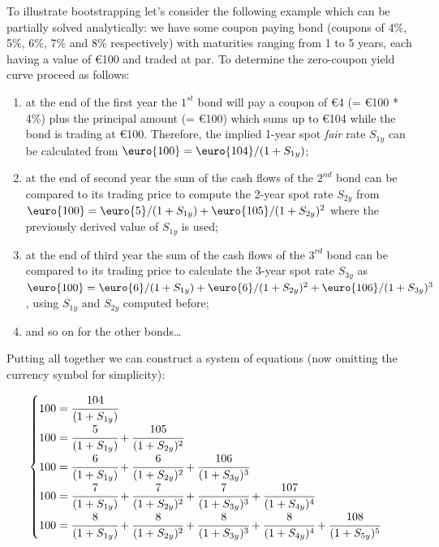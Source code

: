 To illustrate bootstrapping let's consider the following example which can be partially solved analytically: we have some coupon paying bond (coupons of 4\%, 5\%, 6\%, 7\% and 8\% respectively) with maturities ranging from 1 to 5 years, each having a value of \euro{100} and traded at par. To determine the zero-coupon yield curve proceed as follows:
\begin{enumerate}
\item at the end of the first year the $1^{st}$ bond will pay a coupon of \euro{4} (= \euro{100} * 4\%) plus the principal amount (= \euro{100}) which sums up to \euro{104} while the bond is trading at \euro{100}. Therefore, the implied 1-year spot \emph{fair} rate $S_{1y}$ can be calculated from $\mbox{\euro{100}} = \mbox{\euro{104}} / (1 + S_{1y})$;

\item at the end of second year the sum of the cash flows of the $2^{nd}$ bond can be compared to its trading price to compute the 2-year spot rate $S_{2y}$ from $\mbox{\euro{100}} = \mbox{\euro{5}} / (1 + S_{1y}) + \mbox{\euro{105}} / (1 + S_{2y})^{2}$ where the previously derived value of $S_{1y}$ is used;

\item at the end of third year the sum of the cash flows of the $3^{rd}$ bond can be compared to its trading price to calculate the 3-year spot rate $S_{3y}$ as $\mbox{\euro{100}} = \mbox{\euro{6}} / (1 + S_{1y}) + \mbox{\euro{6}} / (1 + S_{2y})^{2} + \mbox{\euro{106}} / (1 + S_{3y})^{3}$, using $S_{1y}$ and $S_{2y}$ computed before;

\item and so on for the other bonds\ldots
\end{enumerate}

Putting all together we can construct a system of equations (now omitting the currency symbol for simplicity):

\begin{equation}
\begin{cases}
100 = \cfrac{104}{(1 + S_{1y})} \\
100 = \cfrac{5}{(1 + S_{1y})} + \cfrac{105}{(1 + S_{2y})^{2}} \\
100 = \cfrac{6} {(1 + S_{1y})} + \cfrac{6}{(1 + S_{2y})^{2}} + \cfrac{106} {(1 + S_{3y})^{3}} \\
100 = \cfrac{7} {(1 + S_{1y})} + \cfrac{7} {(1 + S_{2y})^{2}} + \cfrac{7} {(1 + S_{3y})^{3}} + \cfrac{107} {(1 + S_{4y})^{4}} \\
100 = \cfrac{8} {(1 + S_{1y})} + \cfrac{8} {(1 + S_{2y})^{2}}+ \cfrac{8} {(1 + S_{3y})^{3}} + \cfrac{8} {(1 + S_{4y})^{4}} + \cfrac{108} {(1 + S_{5y})^{5}}
\end{cases}
\label{eq:fifth_year_rate}
\end{equation}


